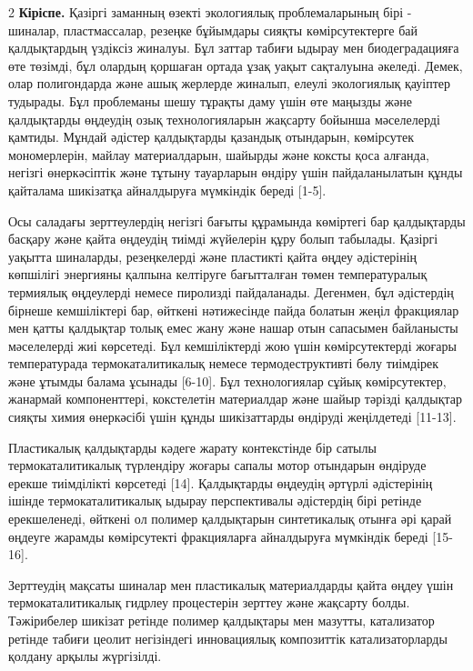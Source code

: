 \begin{multicols}{2}
{\bfseries Кіріспе.} Қазіргі заманның өзекті экологиялық проблемаларының
бірі - шиналар, пластмассалар, резеңке бұйымдары сияқты көмірсутектерге
бай қалдықтардың үздіксіз жиналуы. Бұл заттар табиғи ыдырау мен
биодеградацияға өте төзімді, бұл олардың қоршаған ортада ұзақ уақыт
сақталуына әкеледі. Демек, олар полигондарда және ашық жерлерде жиналып,
елеулі экологиялық қауіптер тудырады. Бұл проблеманы шешу тұрақты даму
үшін өте маңызды және қалдықтарды өңдеудің озық технологияларын жақсарту
бойынша мәселелерді қамтиды. Мұндай әдістер қалдықтарды қазандық
отындарын, көмірсутек мономерлерін, майлау материалдарын, шайырды және
коксты қоса алғанда, негізгі өнеркәсіптік және тұтыну тауарларын өндіру
үшін пайдаланылатын құнды қайталама шикізатқа айналдыруға мүмкіндік
береді {[}1-5{]}.

Осы саладағы зерттеулердің негізгі бағыты құрамында көміртегі бар
қалдықтарды басқару және қайта өңдеудің тиімді жүйелерін құру болып
табылады. Қазіргі уақытта шиналарды, резеңкелерді және пластикті қайта
өңдеу әдістерінің көпшілігі энергияны қалпына келтіруге бағытталған
төмен температуралық термиялық өңдеулерді немесе пиролизді пайдаланады.
Дегенмен, бұл әдістердің бірнеше кемшіліктері бар, өйткені нәтижесінде
пайда болатын жеңіл фракциялар мен қатты қалдықтар толық емес жану және
нашар отын сапасымен байланысты мәселелерді жиі көрсетеді. Бұл
кемшіліктерді жою үшін көмірсутектерді жоғары температурада
термокаталитикалық немесе термодеструктивті бөлу тиімдірек және ұтымды
балама ұсынады {[}6-10{]}. Бұл технологиялар сұйық көмірсутектер,
жанармай компоненттері, кокстелетін материалдар және шайыр тәрізді
қалдықтар сияқты химия өнеркәсібі үшін құнды шикізаттарды өндіруді
жеңілдетеді {[}11-13{]}.

Пластикалық қалдықтарды кәдеге жарату контекстінде бір сатылы
термокаталитикалық түрлендіру жоғары сапалы мотор отындарын өндіруде
ерекше тиімділікті көрсетеді {[}14{]}. Қалдықтарды өңдеудің әртүрлі
әдістерінің ішінде термокаталитикалық ыдырау перспективалы әдістердің
бірі ретінде ерекшеленеді, өйткені ол полимер қалдықтарын синтетикалық
отынға әрі қарай өңдеуге жарамды көмірсутекті фракцияларға айналдыруға
мүмкіндік береді {[}15-16{]}.

Зерттеудің мақсаты шиналар мен пластикалық материалдарды қайта өңдеу
үшін термокаталитикалық гидрлеу процестерін зерттеу және жақсарту болды.
Тәжірибелер шикізат ретінде полимер қалдықтары мен мазутты, катализатор
ретінде табиғи цеолит негізіндегі инновациялық композиттік
катализаторларды қолдану арқылы жүргізілді.


\end{multicols}
